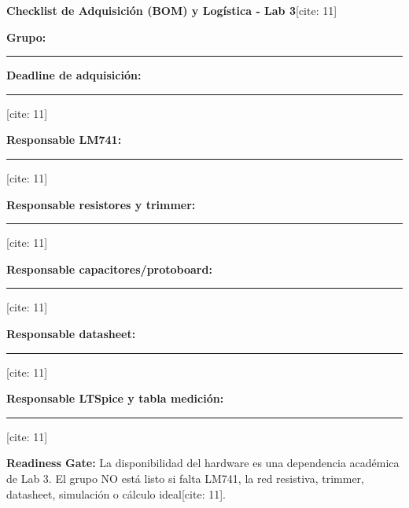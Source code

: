 \documentclass[11pt, a4paper]{article}
\begin{document}
\begin{center}
    \Large\textbf{\textcolor{ucbblue}{Checklist de Adquisición (BOM) y Logística - Lab 3}}[cite: 11]
\end{center}

\begin{tcolorbox}[colback=white, colframe=black, title=\textbf{Group Accountability[cite: 11]}]
    \noindent \textbf{Grupo:} \rule{5cm}{0.4pt} \hfill \textbf{Deadline de adquisición:} \rule{4cm}{0.4pt}[cite: 11] 
    
    \vspace{0.3cm}
    \noindent \textbf{Responsable LM741:} \rule{6cm}{0.4pt}[cite: 11] 
    
    \vspace{0.3cm}
    \noindent \textbf{Responsable resistores y trimmer:} \rule{6cm}{0.4pt}[cite: 11] 
    
    \vspace{0.3cm}
    \noindent \textbf{Responsable capacitores/protoboard:} \rule{6cm}{0.4pt}[cite: 11] 
    
    \vspace{0.3cm}
    \noindent \textbf{Responsable datasheet:} \rule{6cm}{0.4pt}[cite: 11] 
    
    \vspace{0.3cm}
    \noindent \textbf{Responsable LTSpice y tabla medición:} \rule{6cm}{0.4pt}[cite: 11]
\end{tcolorbox}

\vspace{0.4cm}
\noindent \textbf{Readiness Gate:} La disponibilidad del hardware es una dependencia académica de Lab 3. El grupo NO está listo si falta LM741, la red resistiva, trimmer, datasheet, simulación o cálculo ideal[cite: 11].
\end{document}
